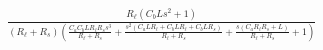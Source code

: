 $\frac{R_{\ell} \left(C_{b} L s^{2} + 1\right)}{\left(R_{\ell} + R_{s}\right) \left(\frac{C_{a} C_{b} L R_{\ell} R_{s} s^{3}}{R_{\ell} + R_{s}} + \frac{s^{2} \left(C_{a} L R_{\ell} + C_{b} L R_{\ell} + C_{b} L R_{s}\right)}{R_{\ell} + R_{s}} + \frac{s \left(C_{a} R_{\ell} R_{s} + L\right)}{R_{\ell} + R_{s}} + 1\right)}$ 